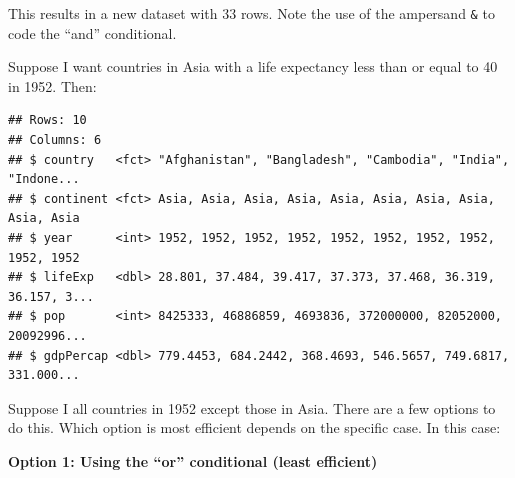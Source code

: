 \documentclass[
]{book}
\newenvironment{Shaded}{\begin{snugshade}}{\end{snugshade}}
\newcommand{\DecValTok}[1]{\textcolor[rgb]{0.00,0.00,0.81}{#1}}
\newcommand{\KeywordTok}[1]{\textcolor[rgb]{0.13,0.29,0.53}{\textbf{#1}}}
\newcommand{\NormalTok}[1]{#1}
\newcommand{\OperatorTok}[1]{\textcolor[rgb]{0.81,0.36,0.00}{\textbf{#1}}}
\newcommand{\StringTok}[1]{\textcolor[rgb]{0.31,0.60,0.02}{#1}}
\begin{document}
This results in a new dataset with 33 rows. Note the use of the ampersand \texttt{\&} to code the ``and'' conditional.

Suppose I want countries in Asia with a life expectancy less than or equal to 40 in 1952. Then:

\begin{Shaded}
\end{Shaded}

\begin{verbatim}
## Rows: 10
## Columns: 6
## $ country   <fct> "Afghanistan", "Bangladesh", "Cambodia", "India", "Indone...
## $ continent <fct> Asia, Asia, Asia, Asia, Asia, Asia, Asia, Asia, Asia, Asia
## $ year      <int> 1952, 1952, 1952, 1952, 1952, 1952, 1952, 1952, 1952, 1952
## $ lifeExp   <dbl> 28.801, 37.484, 39.417, 37.373, 37.468, 36.319, 36.157, 3...
## $ pop       <int> 8425333, 46886859, 4693836, 372000000, 82052000, 20092996...
## $ gdpPercap <dbl> 779.4453, 684.2442, 368.4693, 546.5657, 749.6817, 331.000...
\end{verbatim}

Suppose I all countries in 1952 except those in Asia. There are a few options to do this. Which option is most efficient depends on the specific case. In this case:

\textbf{Option 1: Using the ``or'' conditional \texttt{\textbar{}} (least efficient)}

\begin{Shaded}
\end{Shaded}
\end{document}

